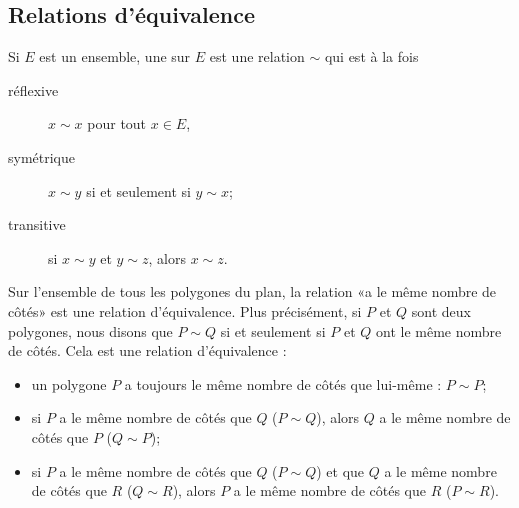 \subsection{Relations d'équivalence}
\label{appEquivalence}

\begin{definition}  \label{DefHoJzMp}
Si $E$ est un ensemble, une  sur $E$ est une relation $\sim$ qui est à la fois
\begin{description}
	\item[réflexive] $x\sim x$ pour tout $x\in E$,
	\item[symétrique] $x\sim y$ si et seulement si $y\sim x$;
	\item[transitive] si $x\sim y$ et $y\sim z$, alors $x\sim z$.
\end{description}
\end{definition}

\begin{example}
    Sur l'ensemble de tous les polygones du plan, la relation «a le même nombre de côtés» est une relation d'équivalence. Plus précisément, si $P$ et $Q$ sont deux polygones, nous disons que $P\sim Q$ si et seulement si $P$ et $Q$ ont le même nombre de côtés. Cela est une relation d'équivalence :
    \begin{itemize}
        \item
            un polygone $P$ a toujours le même nombre de côtés que lui-même : $P\sim P$;
        \item
            si $P$ a le même nombre de côtés que $Q$ ($P\sim Q$), alors $Q$ a le même nombre de côtés que $P$ ($Q\sim P$);
        \item
            si $P$ a le même nombre de côtés que $Q$ ($P\sim Q$) et que $Q$ a le même nombre de côtés que $R$ ($Q\sim R$), alors $P$ a le même nombre de côtés que $R$ ($P\sim R$).
    \end{itemize}
\end{example}

